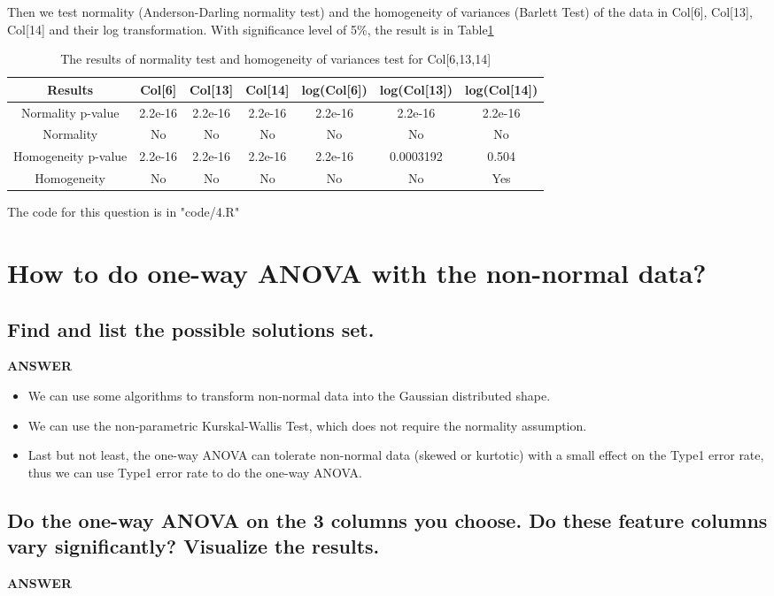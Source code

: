 \documentclass[a4paper]{article}
\begin{document}
Then we test normality (Anderson-Darling normality test) and the homogeneity of variances (Barlett Test) of the data in Col[6], Col[13], Col[14] and their log transformation. With significance level of 5\%, the result is in Table\ref{tab:table2}

\begin{table}[htbp]
	\centering
	\caption{The results of normality test and homogeneity of variances test for Col[6,13,14]}
	\label{tab:table2}
	\begin{tabular}{|c|c|c|c|c|c|c|}
		\hline
		Results & Col[6] & Col[13] & Col[14] & log(Col[6]) & log(Col[13]) & log(Col[14]) \\
		\hline
		Normality p-value & 2.2e-16 & 2.2e-16 & 2.2e-16 & 2.2e-16 & 2.2e-16 & 2.2e-16\\
		\hline
		Normality & No & No & No & No & No & No\\
		\hline
		Homogeneity p-value & 2.2e-16 & 2.2e-16 & 2.2e-16 & 2.2e-16 & 0.0003192 & 0.504 \\
		\hline
		Homogeneity & No & No & No & No & No & Yes \\
		\hline
	\end{tabular}
\end{table}

The code for this question is in "code/4.R"

\section{How to do one-way ANOVA with the non-normal data?}
\subsection{Find and list the possible solutions set.}
\textbf{ANSWER}

\begin{itemize}
	\item We can use some algorithms to transform non-normal data into the Gaussian distributed shape.
	\item We can use the non-parametric Kurskal-Wallis Test, which does not require the normality assumption.
	\item Last but not least, the one-way ANOVA can tolerate non-normal data (skewed or kurtotic) with a small effect on the Type1 error rate, thus we can use Type1 error rate to do the one-way ANOVA.
\end{itemize}

\subsection{Do the one-way ANOVA on the 3 columns you choose. Do these
	feature columns vary significantly? Visualize the results.}
\textbf{ANSWER}
\end{document}
